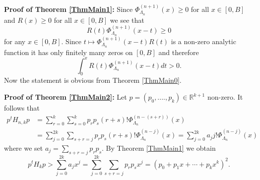 \documentclass[11pt]{article}%
\begin{document}
\bigskip

\textbf{Proof of Theorem \ref{ThmMain1}:} Since $\Phi_{\Lambda_{n}}^{\left(
n+1\right)  }\left(  x\right)  \geq0$ for all $x\in\left[  0,B\right]  $ and
$R\left(  x\right)  \geq0$ for all $x\in\left[  0,B\right]  $ we see that%
\[
R\left(  t\right)  \Phi_{\Lambda_{n}}^{\left(  n+1\right)  }\left(
x-t\right)  \geq0
\]
for any $x\in\left[  0,B\right]  .$ Since $t\longmapsto\Phi_{\Lambda_{n}%
}^{\left(  n+1\right)  }\left(  x-t\right)  R\left(  t\right)  $ is a non-zero
analytic function it has only finitely many zeros on $\left[  0,B\right]  $
and therefore
\[
\int_{0}^{x}R\left(  t\right)  \Phi_{\Lambda_{n}}^{\left(  n+1\right)
}\left(  x-t\right)  dt>0.
\]
Now the statement is obvious from Theorem \ref{ThmMain0}.

\bigskip

\textbf{Proof of Theorem \ref{ThmMain2}:} Let $p=\left(  p_{0},....,p_{k}%
\right)  \in\mathbb{R}^{k+1}$ non-zero. It follows that
\begin{align*}
p^{t}H_{n,k}p  &  =%
{\displaystyle\sum_{r=0}^{k}}
{\displaystyle\sum_{s=0}^{k}}
p_{r}p_{s}\left(  r+s\right)  !\Phi_{\Lambda_{n}}^{\left(  n-\left(
s+r\right)  \right)  }\left(  x\right) \\
&  =%
{\displaystyle\sum_{j=0}^{2k}}
{\displaystyle\sum_{s+r=j}}
p_{r}p_{s}\left(  r+s\right)  !\Phi_{\Lambda_{n}}^{\left(  n-j\right)
}\left(  x\right)  =%
{\displaystyle\sum_{j=0}^{2k}}
a_{j}j!\Phi_{\Lambda_{n}}^{\left(  n-j\right)  }\left(  x\right)
\end{align*}
where we set $a_{j}=%
{\displaystyle\sum_{s+r=j}}
p_{r}p_{s}.$ By Theorem \ref{ThmMain1} we obtain
\[
p^{t}H_{k}p>%
{\displaystyle\sum_{j=0}^{2k}}
a_{j}x^{j}=%
{\displaystyle\sum_{j=0}^{2k}}
{\displaystyle\sum_{s+r=j}}
p_{r}p_{s}x^{j}=\left(  p_{0}+p_{1}x+\cdots+p_{k}x^{k}\right)  ^{2}.
\]
\end{document}
